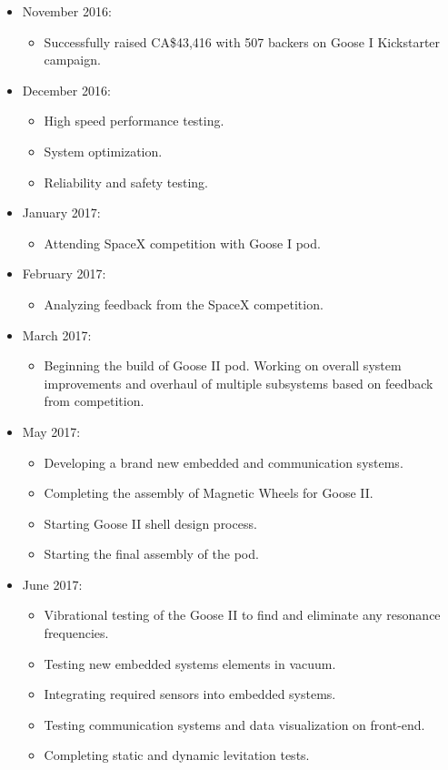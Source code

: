 \documentclass[main.tex]{subfiles}
\begin{document}
\begin{flushleft}
\begin{itemize}
\item November 2016:
\begin{itemize}
    \item Successfully raised CA\$43,416 with 507 backers on Goose I Kickstarter campaign.
\end{itemize}

\item December 2016:
\begin{itemize}
    \item High speed performance testing.
    \item System optimization.
    \item Reliability and safety testing.
\end{itemize}

\item January 2017:
\begin{itemize}
    \item Attending SpaceX competition with Goose I pod.
\end{itemize}

\item February 2017:
\begin{itemize}
    \item Analyzing feedback from the SpaceX competition.
\end{itemize}

\item March 2017:
\begin{itemize}
    \item Beginning the build of Goose II pod. Working on overall system improvements and overhaul of multiple subsystems based on feedback from competition.
\end{itemize}

\item May 2017:
\begin{itemize}
    \item Developing a brand new embedded and communication systems.
    \item Completing the assembly of Magnetic Wheels for Goose II.
    \item Starting Goose II shell design process.
    \item Starting the final assembly of the pod.
\end{itemize}

\item June 2017:
\begin{itemize}
    \item Vibrational testing of the Goose II to find and eliminate any resonance frequencies.
    \item Testing new embedded systems elements in vacuum.
    \item Integrating required sensors into embedded systems.
    \item Testing communication systems and data visualization on front-end.
    \item Completing static and dynamic levitation tests.
\end{itemize}


\end{itemize}
\end{flushleft}
\end{document}
